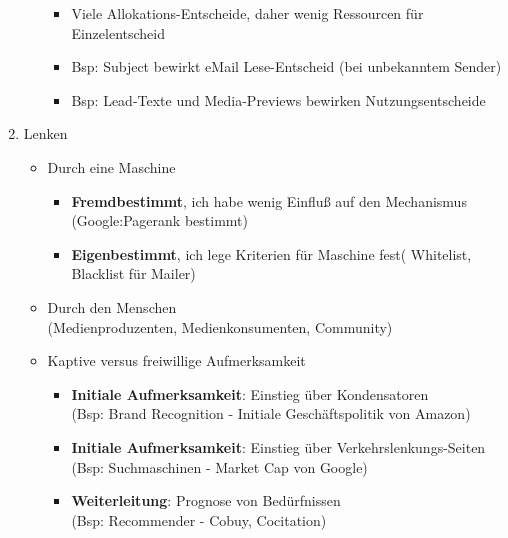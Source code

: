 \documentclass{article} %
\begin{document}
\begin{enumerate}
\begin{itemize}
\begin{itemize}
				\item Viele Allokations-Entscheide, daher wenig Ressourcen für Einzelentscheid
				\item Bsp: Subject bewirkt eMail Lese-Entscheid (bei unbekanntem Sender)
				\item Bsp: Lead-Texte und Media-Previews bewirken Nutzungsentscheide
			\end{itemize}
		\end{itemize}
		\item Lenken
		\begin{itemize}
			\item Durch eine Maschine
			\begin{itemize}
				\item \textbf{Fremdbestimmt}, ich habe wenig Einfluß auf den Mechanismus (Google:Pagerank bestimmt)
				\item \textbf{Eigenbestimmt}, ich lege Kriterien für Maschine fest( Whitelist, Blacklist für Mailer)
			\end{itemize}
			\item Durch den Menschen\\
			(Medienproduzenten, Medienkonsumenten, Community)
			\item Kaptive versus freiwillige Aufmerksamkeit
			\begin{itemize}
				\item \textbf{Initiale Aufmerksamkeit}: Einstieg über Kondensatoren\\
				(Bsp: Brand Recognition - Initiale Geschäftspolitik von Amazon)	
				\item \textbf{Initiale Aufmerksamkeit}: Einstieg über Verkehrslenkungs-Seiten\\
				(Bsp: Suchmaschinen - Market Cap von Google)
				\item \textbf{Weiterleitung}: Prognose von Bedürfnissen\\
				(Bsp: Recommender - Cobuy, Cocitation)
			\end{itemize}
		\end{itemize}		
	\end{enumerate}
\end{document}

